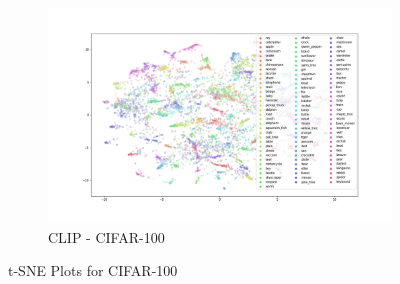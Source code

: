 \documentclass{article}
\theoremstyle{definition}
\begin{document}
\begin{figure}[h!]
\begin{subfigure}{.65\textwidth}
        \includegraphics[width=\linewidth]{Final project/img/CIFAR100_vit-base-patch32-384_train.png}
        \caption{CLIP - CIFAR-100}
    \end{subfigure}
    \caption{t-SNE Plots for CIFAR-100}
    \label{fig:tsne4}
\end{figure}

\end{document}
